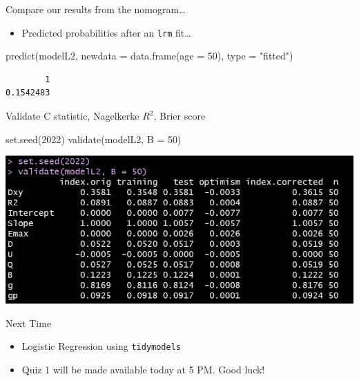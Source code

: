 \documentclass[
  ignorenonframetext,
]{beamer}
\newenvironment{Shaded}{\begin{snugshade}}{\end{snugshade}}
\newcommand{\AttributeTok}[1]{\textcolor[rgb]{0.77,0.63,0.00}{#1}}
\newcommand{\DecValTok}[1]{\textcolor[rgb]{0.00,0.00,0.81}{#1}}
\newcommand{\FunctionTok}[1]{\textcolor[rgb]{0.00,0.00,0.00}{#1}}
\newcommand{\NormalTok}[1]{#1}
\newcommand{\StringTok}[1]{\textcolor[rgb]{0.31,0.60,0.02}{#1}}
\providecommand{\tightlist}{%
  \setlength{\itemsep}{0pt}\setlength{\parskip}{0pt}}
\begin{document}
\begin{frame}[fragile]{Compare our results from the nomogram\ldots{}}
\protect\hypertarget{compare-our-results-from-the-nomogram}{}
\begin{itemize}
\tightlist
\item
  Predicted probabilities after an \texttt{lrm} fit\ldots{}
\end{itemize}

\begin{Shaded}
\begin{Highlighting}[]
\FunctionTok{predict}\NormalTok{(modelL2, }\AttributeTok{newdata =} \FunctionTok{data.frame}\NormalTok{(}\AttributeTok{age =} \DecValTok{50}\NormalTok{),}
        \AttributeTok{type =} \StringTok{"fitted"}\NormalTok{)}
\end{Highlighting}
\end{Shaded}

\begin{verbatim}
        1 
0.1542483 
\end{verbatim}
\end{frame}

\begin{frame}[fragile]{Validate C statistic, Nagelkerke \(R^2\), Brier
score}
\protect\hypertarget{validate-c-statistic-nagelkerke-r2-brier-score}{}
\begin{Shaded}
\begin{Highlighting}[]
\FunctionTok{set.seed}\NormalTok{(}\DecValTok{2022}\NormalTok{)}
\FunctionTok{validate}\NormalTok{(modelL2, }\AttributeTok{B =} \DecValTok{50}\NormalTok{)}
\end{Highlighting}
\end{Shaded}

\begin{center}\includegraphics[width=0.9\linewidth]{figures/framval1} \end{center}
\end{frame}

\begin{frame}[fragile]{Next Time}
\protect\hypertarget{next-time}{}
\begin{itemize}
\tightlist
\item
  Logistic Regression using \texttt{tidymodels}
\item
  Quiz 1 will be made available today at 5 PM. Good luck!
\end{itemize}
\end{frame}
\end{document}
